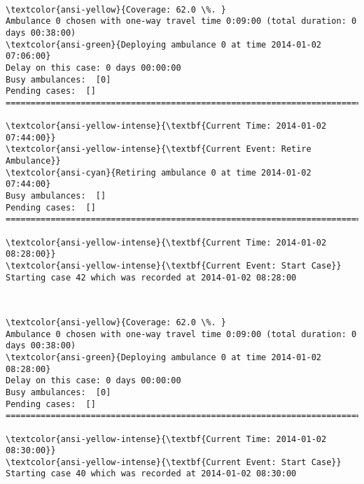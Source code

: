 \documentclass[11pt]{article}
\begin{document}
    \begin{center}
    \end{center}
    { \hspace*{\fill} \\}
    
    \begin{Verbatim}[commandchars=\\\{\}]
\textcolor{ansi-yellow}{Coverage: 62.0 \%. }
Ambulance 0 chosen with one-way travel time 0:09:00 (total duration: 0 days 00:38:00)
\textcolor{ansi-green}{Deploying ambulance 0 at time 2014-01-02 07:06:00}
Delay on this case: 0 days 00:00:00
Busy ambulances:  [0]
Pending cases:  []
========================================================================

\textcolor{ansi-yellow-intense}{\textbf{Current Time: 2014-01-02 07:44:00}}
\textcolor{ansi-yellow-intense}{\textbf{Current Event: Retire Ambulance}}
\textcolor{ansi-cyan}{Retiring ambulance 0 at time 2014-01-02 07:44:00}
Busy ambulances:  []
Pending cases:  []
========================================================================

\textcolor{ansi-yellow-intense}{\textbf{Current Time: 2014-01-02 08:28:00}}
\textcolor{ansi-yellow-intense}{\textbf{Current Event: Start Case}}
Starting case 42 which was recorded at 2014-01-02 08:28:00

    \end{Verbatim}

    \begin{center}
    \end{center}
    { \hspace*{\fill} \\}
    
    \begin{Verbatim}[commandchars=\\\{\}]
\textcolor{ansi-yellow}{Coverage: 62.0 \%. }
Ambulance 0 chosen with one-way travel time 0:09:00 (total duration: 0 days 00:38:00)
\textcolor{ansi-green}{Deploying ambulance 0 at time 2014-01-02 08:28:00}
Delay on this case: 0 days 00:00:00
Busy ambulances:  [0]
Pending cases:  []
========================================================================

\textcolor{ansi-yellow-intense}{\textbf{Current Time: 2014-01-02 08:30:00}}
\textcolor{ansi-yellow-intense}{\textbf{Current Event: Start Case}}
Starting case 40 which was recorded at 2014-01-02 08:30:00

    \end{Verbatim}
\end{document}
